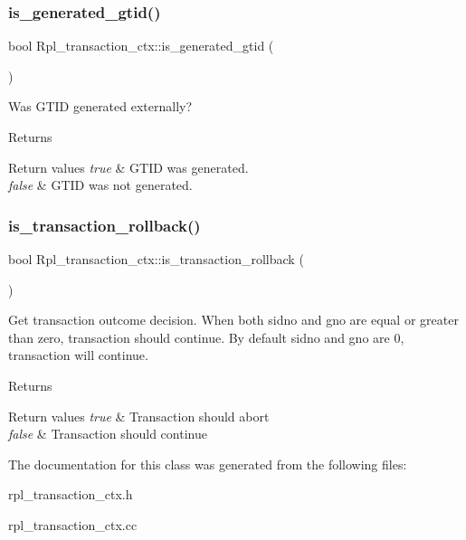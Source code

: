 \subsubsection{\texorpdfstring{is\+\_\+generated\+\_\+gtid()}{is\_generated\_gtid()}}
{\footnotesize\ttfamily bool Rpl\+\_\+transaction\+\_\+ctx\+::is\+\_\+generated\+\_\+gtid (\begin{DoxyParamCaption}{ }\end{DoxyParamCaption})}

Was G\+T\+ID generated externally?

\begin{DoxyReturn}{Returns}

\end{DoxyReturn}

\begin{DoxyRetVals}{Return values}
{\em true} & G\+T\+ID was generated. \\
\hline
{\em false} & G\+T\+ID was not generated. \\
\hline
\end{DoxyRetVals}
\mbox{\label{classRpl__transaction__ctx_a9e0566ffa58a8b7d85339fefc4b1c177}} 
\subsubsection{\texorpdfstring{is\+\_\+transaction\+\_\+rollback()}{is\_transaction\_rollback()}}
{\footnotesize\ttfamily bool Rpl\+\_\+transaction\+\_\+ctx\+::is\+\_\+transaction\+\_\+rollback (\begin{DoxyParamCaption}{ }\end{DoxyParamCaption})}

Get transaction outcome decision. When both sidno and gno are equal or greater than zero, transaction should continue. By default sidno and gno are 0, transaction will continue.

\begin{DoxyReturn}{Returns}

\end{DoxyReturn}

\begin{DoxyRetVals}{Return values}
{\em true} & Transaction should abort \\
\hline
{\em false} & Transaction should continue \\
\hline
\end{DoxyRetVals}


The documentation for this class was generated from the following files\+:\begin{DoxyCompactItemize}
\item 
rpl\+\_\+transaction\+\_\+ctx.\+h\item 
rpl\+\_\+transaction\+\_\+ctx.\+cc\end{DoxyCompactItemize}

